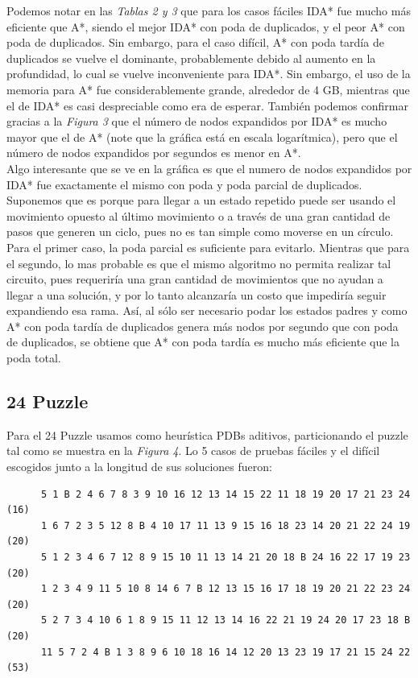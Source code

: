\documentclass[a4paper,10pt]{article}
\begin{document}
    Podemos notar en las \textit{Tablas 2 y 3} que para los casos f\'aciles IDA* fue mucho 
    m\'as eficiente que A*, siendo el mejor IDA* con poda de duplicados, y el peor A*
    con poda de duplicados. Sin embargo, para el caso dif\'icil, A* con 
    poda tard\'ia de duplicados se vuelve el dominante, probablemente debido 
    al aumento en la profundidad, lo cual se vuelve inconveniente para IDA*. Sin embargo,
    el uso de la memoria para A* fue considerablemente grande, alrededor de 4 GB, mientras
    que el de IDA* es casi despreciable como era de esperar. Tambi\'en podemos confirmar 
    gracias a la \textit{Figura 3} que el n\'umero de nodos expandidos por IDA* es mucho
    mayor que el de A* (note que la gr\'afica est\'a en escala logar\'itmica), pero que 
    el n\'umero de nodos expandidos por segundos es menor en A*. \\
    
    Algo interesante que se ve en la gr\'afica es que el numero de nodos expandidos por 
    IDA* fue exactamente el mismo con poda y poda parcial de duplicados.
    Suponemos que es porque para llegar a un estado repetido puede ser usando el movimiento
    opuesto al \'ultimo movimiento o a trav\'es de una gran cantidad de pasos que generen un
    ciclo, pues no es tan simple como moverse en un c\'irculo. Para el primer caso, la 
    poda parcial es suficiente para evitarlo. Mientras que para el segundo, lo mas 
    probable es que el mismo algoritmo no permita realizar tal circuito, pues requerir\'ia una 
    gran cantidad de movimientos que no ayudan a llegar a una soluci\'on, y por lo tanto 
    alcanzar\'ia un costo que impedir\'ia seguir expandiendo esa rama. As\'i, al s\'olo
    ser necesario podar los estados padres y como A* con poda tard\'ia 
    de duplicados genera m\'as nodos por segundo que con poda de duplicados, 
    se obtiene que A* con poda tard\'ia es mucho m\'as eficiente que la poda total.
    
  \subsection{24 Puzzle}
    Para el 24 Puzzle usamos como heur\'istica PDBs aditivos, particionando
    el puzzle tal como se muestra en la \textit{Figura 4}. Lo 5 casos de pruebas f\'aciles 
    y el dif\'icil escogidos junto a la longitud de sus soluciones fueron:
  
  \begin{verbatim}
      5 1 B 2 4 6 7 8 3 9 10 16 12 13 14 15 22 11 18 19 20 17 21 23 24 (16)
      1 6 7 2 3 5 12 8 B 4 10 17 11 13 9 15 16 18 23 14 20 21 22 24 19 (20)
      5 1 2 3 4 6 7 12 8 9 15 10 11 13 14 21 20 18 B 24 16 22 17 19 23 (20)
      1 2 3 4 9 11 5 10 8 14 6 7 B 12 13 15 16 17 18 19 20 21 22 23 24 (20)
      5 2 7 3 4 10 6 1 8 9 15 11 12 13 14 16 22 21 19 24 20 17 23 18 B (20)
      11 5 7 2 4 B 1 3 8 9 6 10 18 16 14 12 20 13 23 19 17 21 15 24 22 (53)
    \end{verbatim}
    
\end{document}
